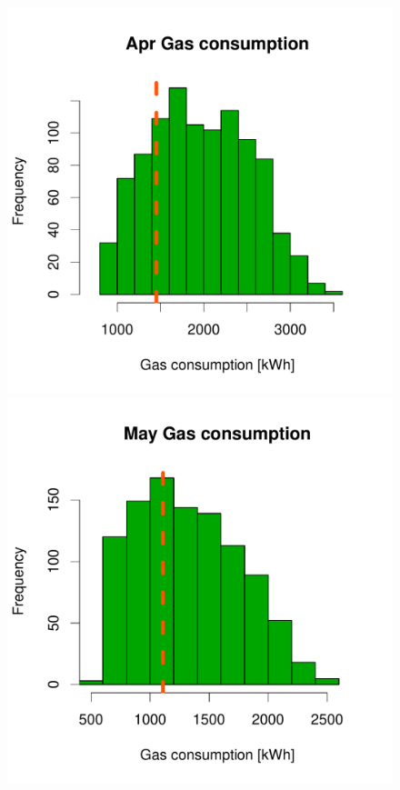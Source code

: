 \documentclass[a4paper, 12pt]{article}
\begin{document}
\begin{figure}
 \includegraphics[width=\scale]{Simulation_histograms/Batch_2_Only/Gas_Runs/Apr_Gas}
 \includegraphics[width=\scale]{Simulation_histograms/Batch_2_Only/Gas_Runs/May_Gas}

\end{figure}
\end{document}
